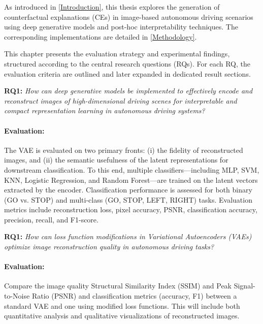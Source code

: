 As introduced in \cref{Introduction}, this thesis explores the generation of counterfactual explanations (CEs) in image-based autonomous driving scenarios using deep generative models and post-hoc interpretability techniques. The corresponding implementations are detailed in \cref{Methodology}.

This chapter presents the evaluation strategy and experimental findings, structured according to the central research questions (RQs). For each RQ, the evaluation criteria are outlined and later expanded in dedicated result sections.

\textbf{RQ1:} \textit{How can deep generative models be implemented to effectively encode and reconstruct images of high-dimensional driving scenes for interpretable and compact representation learning in autonomous driving systems?}

\vspace{-1em}

\paragraph{Evaluation:}The VAE is evaluated on two primary fronts: (i) the fidelity of reconstructed images, and (ii) the semantic usefulness of the latent representations for downstream classification. To this end, multiple classifiers—including MLP, SVM, KNN, Logistic Regression, and Random Forest—are trained on the latent vectors extracted by the encoder. Classification performance is assessed for both binary (GO vs. STOP) and multi-class (GO, STOP, LEFT, RIGHT) tasks. Evaluation metrics include reconstruction loss, pixel accuracy, PSNR, classification accuracy, precision, recall, and F1-score.
    
\vspace{1em}

\textbf{RQ1:} \textit{How can loss function modifications in Variational Autoencoders (VAEs) optimize image reconstruction quality in autonomous driving tasks?} 

\vspace{-1em}

\paragraph{Evaluation:}Compare the image quality Structural Similarity Index (SSIM) and Peak Signal-to-Noise Ratio (PSNR) and classification metrics (accuracy, F1) between a standard VAE and one using modified loss functions. This will include both quantitative analysis and qualitative visualizations of reconstructed images.

